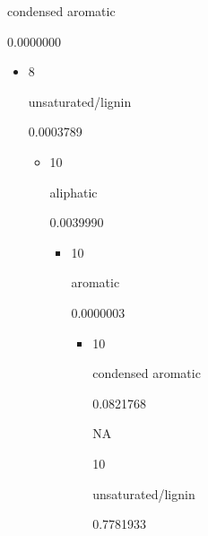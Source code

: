 \documentclass[
]{article}
\begin{document}
\begin{itemize}
\begin{itemize}
\begin{itemize}
\begin{itemize}
\begin{itemize}
\begin{itemize}
\begin{itemize}
\begin{itemize}
\begin{itemize}
\begin{itemize}
\begin{itemize}
\begin{itemize}
                        condensed aromatic

                        0.0000000

                        \begin{itemize}
                        \item
                          8

                          unsaturated/lignin

                          0.0003789

                          \begin{itemize}
                          \item
                            10

                            aliphatic

                            0.0039990

                            \begin{itemize}
                            \item
                              10

                              aromatic

                              0.0000003

                              \begin{itemize}
                              \item
                                10

                                condensed aromatic

                                0.0821768

                                NA

                                10

                                unsaturated/lignin

                                0.7781933


\end{itemize}
\end{itemize}
\end{itemize}
\end{itemize}
\end{itemize}
\end{itemize}
\end{itemize}
\end{itemize}
\end{itemize}
\end{itemize}
\end{itemize}
\end{itemize}
\end{itemize}
\end{itemize}
\end{itemize}
\end{itemize}
\end{document}
